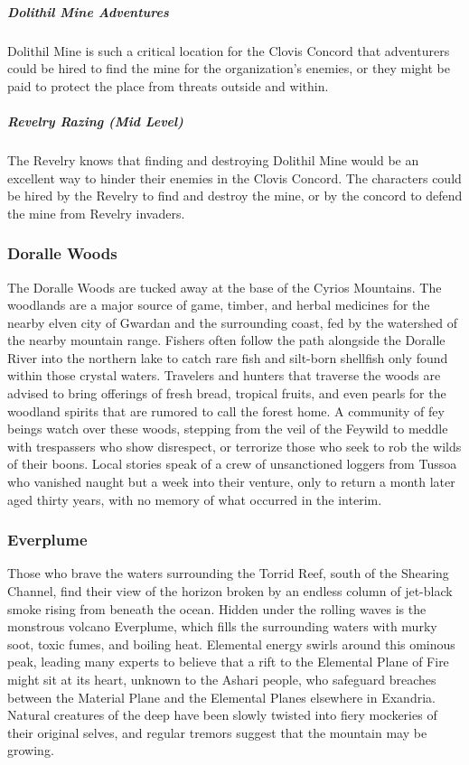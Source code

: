 \documentclass[10pt,a4paper,twoside,bg=print,twocolumn,openany,nodeprecatedcode]{dndbook}
\begin{document}
\subparagraph{Dolithil Mine Adventures}
Dolithil Mine is such a critical location for the Clovis Concord that adventurers could be hired to find the mine for the organization's enemies, or they might be paid to protect the place from threats outside and within.

\subparagraph{Revelry Razing (Mid Level)}
The Revelry knows that finding and destroying Dolithil Mine would be an excellent way to hinder their enemies in the Clovis Concord. The characters could be hired by the Revelry to find and destroy the mine, or by the concord to defend the mine from Revelry invaders.

\subsubsection{Doralle Woods}
The Doralle Woods are tucked away at the base of the Cyrios Mountains. The woodlands are a major source of game, timber, and herbal medicines for the nearby elven city of Gwardan and the surrounding coast, fed by the watershed of the nearby mountain range. Fishers often follow the path alongside the Doralle River into the northern lake to catch rare fish and silt-born shellfish only found within those crystal waters. Travelers and hunters that traverse the woods are advised to bring offerings of fresh bread, tropical fruits, and even pearls for the woodland spirits that are rumored to call the forest home. A community of fey beings watch over these woods, stepping from the veil of the Feywild to meddle with trespassers who show disrespect, or terrorize those who seek to rob the wilds of their boons. Local stories speak of a crew of unsanctioned loggers from Tussoa who vanished naught but a week into their venture, only to return a month later aged thirty years, with no memory of what occurred in the interim.

\subsubsection{Everplume}
Those who brave the waters surrounding the Torrid Reef, south of the Shearing Channel, find their view of the horizon broken by an endless column of jet-black smoke rising from beneath the ocean. Hidden under the rolling waves is the monstrous volcano Everplume, which fills the surrounding waters with murky soot, toxic fumes, and boiling heat. Elemental energy swirls around this ominous peak, leading many experts to believe that a rift to the Elemental Plane of Fire might sit at its heart, unknown to the Ashari people, who safeguard breaches between the Material Plane and the Elemental Planes elsewhere in Exandria. Natural creatures of the deep have been slowly twisted into fiery mockeries of their original selves, and regular tremors suggest that the mountain may be growing.
\end{document}

